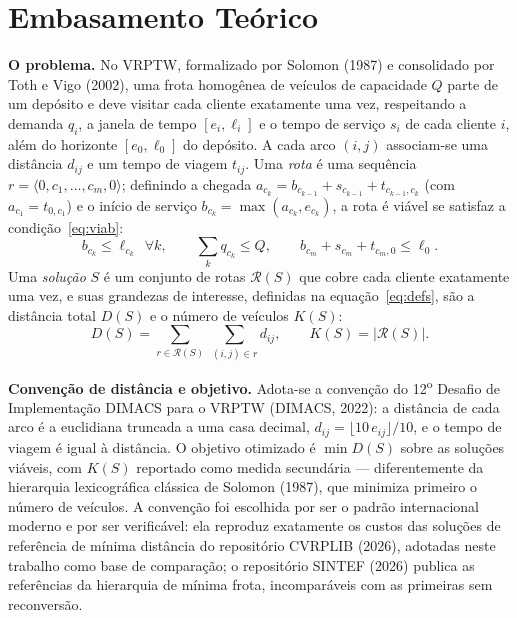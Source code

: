 \documentclass[10pt,a4paper]{article}
\begin{document}
\section{Embasamento Teórico}
\textbf{O problema.} No VRPTW, formalizado por Solomon (1987) e consolidado por Toth e Vigo (2002), uma frota homogênea de veículos de capacidade $Q$ parte de um depósito e deve visitar cada cliente exatamente uma vez, respeitando a demanda $q_i$, a janela de tempo $[e_i,\ell_i]$ e o tempo de serviço $s_i$ de cada cliente $i$, além do horizonte $[e_0,\ell_0]$ do depósito. A cada arco $(i,j)$ associam-se uma distância $d_{ij}$ e um tempo de viagem $t_{ij}$. Uma \emph{rota} é uma sequência $r=\langle 0,c_1,\dots,c_m,0\rangle$; definindo a chegada $a_{c_k}=b_{c_{k-1}}+s_{c_{k-1}}+t_{c_{k-1},c_k}$ (com $a_{c_1}=t_{0,c_1}$) e o início de serviço $b_{c_k}=\max(a_{c_k},e_{c_k})$, a rota é viável se satisfaz a condição~\eqref{eq:viab}:
\begin{equation}
b_{c_k}\le \ell_{c_k}\ \ \forall k,\qquad \sum_{k} q_{c_k}\le Q,\qquad b_{c_m}+s_{c_m}+t_{c_m,0}\le \ell_0 .
\label{eq:viab}
\end{equation}
Uma \emph{solução} $S$ é um conjunto de rotas $\mathcal{R}(S)$ que cobre cada cliente exatamente uma vez, e suas grandezas de interesse, definidas na equação~\eqref{eq:defs}, são a distância total $D(S)$ e o número de veículos $K(S)$:
\begin{equation}
D(S)=\sum_{r\in\mathcal{R}(S)}\ \sum_{(i,j)\in r} d_{ij},\qquad K(S)=|\mathcal{R}(S)|.
\label{eq:defs}
\end{equation}

\vspace{\baselineskip}
\textbf{Convenção de distância e objetivo.} Adota-se a convenção do 12\textsuperscript{o} Desafio de Implementação DIMACS para o VRPTW (DIMACS, 2022): a distância de cada arco é a euclidiana truncada a uma casa decimal, $d_{ij}=\lfloor 10\,e_{ij}\rfloor/10$, e o tempo de viagem é igual à distância. O objetivo otimizado é $\min D(S)$ sobre as soluções viáveis, com $K(S)$ reportado como medida secundária --- diferentemente da hierarquia lexicográfica clássica de Solomon (1987), que minimiza primeiro o número de veículos. A convenção foi escolhida por ser o padrão internacional moderno e por ser verificável: ela reproduz exatamente os custos das soluções de referência de mínima distância do repositório CVRPLIB (2026), adotadas neste trabalho como base de comparação; o repositório SINTEF (2026) publica as referências da hierarquia de mínima frota, incomparáveis com as primeiras sem reconversão.
\end{document}
